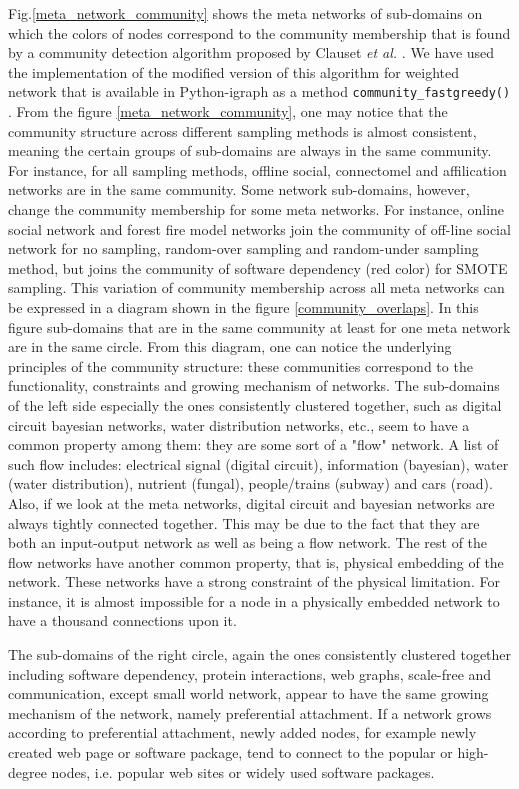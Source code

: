 \documentclass{article}
\begin{document}
Fig.\ref{meta_network_community} shows the meta networks of sub-domains on which the colors of nodes correspond to the community membership that is found by a community detection algorithm proposed by Clauset \textit{et al.} \cite{CNMAlgorithm}. We have used the implementation of the modified version of this algorithm for weighted network that is available in Python-igraph as a method \texttt{community\_fastgreedy()} \cite{igraph}. From the figure \ref{meta_network_community}, one may notice that the community structure across different sampling methods is almost consistent, meaning the certain groups of sub-domains are always in the same community.  For instance, for all sampling methods, offline social, connectomel and affilication networks are in the same community. Some network sub-domains, however, change the community membership for some meta networks. For instance, online social network and forest fire model networks join the community of off-line social network for no sampling, random-over sampling and random-under sampling method, but joins the community of software dependency (red color) for SMOTE sampling. This variation of community membership across all meta networks can be expressed in a diagram shown in the figure \ref{community_overlaps}. In this figure sub-domains that are in the same community at least for one meta network are in the same circle. From this diagram, one can notice the underlying principles of the community structure: these communities correspond to the functionality, constraints and growing mechanism of networks. The sub-domains of the left side especially the ones consistently clustered together, such as digital circuit bayesian networks, water distribution networks, etc., seem to have a common property among them: they are some sort of a "flow" network. A list of such flow includes: electrical signal (digital circuit), information (bayesian), water (water distribution), nutrient (fungal), people/trains (subway) and cars (road). Also, if we look at the meta networks, digital circuit and bayesian networks are always tightly connected together. This may be due to the fact that they are both an input-output network as well as being a flow network. The rest of the flow networks have another common property, that is, physical embedding of the network. These networks have a strong constraint of the physical limitation. For instance, it is almost impossible for a node in a physically embedded network to have a thousand connections upon it.

The sub-domains of the right circle, again the ones consistently clustered together including software dependency, protein interactions, web graphs, scale-free and communication, except small world network, appear to have the same growing mechanism of the network, namely preferential attachment. If a network grows according to preferential attachment, newly added nodes, for example newly created web page or software package, tend to connect to the popular or high-degree nodes, i.e. popular web sites or widely used software packages. 
\end{document}
